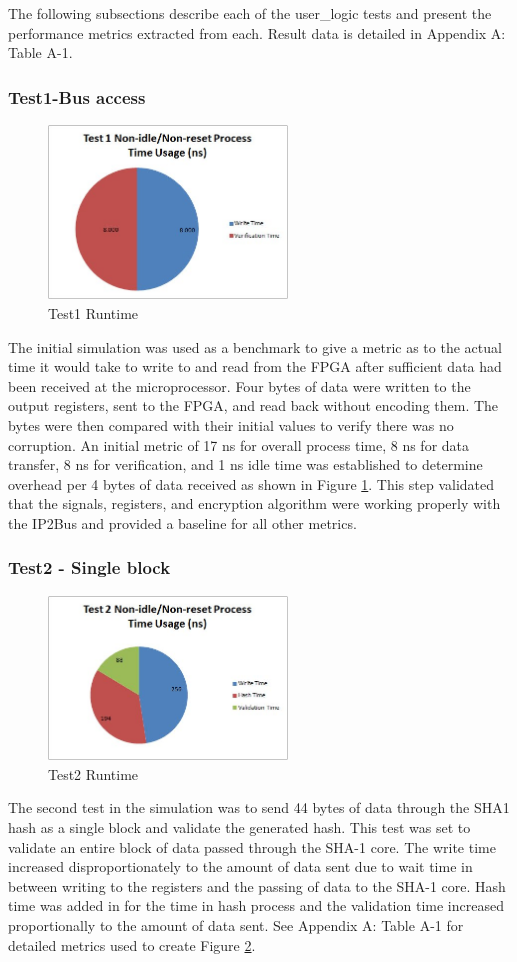 \documentclass[journal]{IEEEtran}
\begin{document}
The following subsections describe each of the user\_logic tests and present the performance metrics extracted from each.  Result data is detailed in Appendix A: Table A-1.
\subsubsection{Test1-Bus access}
\begin{figure}[ht]
\centering
\includegraphics[width=2.5in]{Test1.jpg}
\caption{Test1 Runtime}
\label{fig_test1Runtime}
\end{figure} 
The initial simulation was used as a benchmark to give a metric as to the actual time it would take to write to and read from the FPGA after sufficient data had been received at the microprocessor.  Four bytes of data were written to the output registers, sent to the FPGA, and read back without encoding them.  The bytes were then compared with their initial values to verify there was no corruption.  An initial metric of 17 ns for overall process time, 8 ns for data transfer, 8 ns for verification, and 1 ns idle time was established to determine overhead per 4 bytes of data received as shown in Figure \ref{fig_test1Runtime}.  This step validated that the signals, registers, and encryption algorithm were working properly with the IP2Bus and provided a baseline for all other metrics.
\subsubsection{Test2 - Single block}
\begin{figure}[ht]
\centering
\includegraphics[width=2.5in]{Test2.jpg}
\caption{Test2 Runtime}
\label{fig_test2Runtime}
\end{figure} 
The second test in the simulation was to send 44 bytes of data through the SHA1 hash as a single block and validate the generated hash.  This test was set to validate an entire block of data passed through the SHA-1 core.  The write time increased disproportionately to the amount of data sent due to wait time in between writing to the registers and the passing of data to the SHA-1 core.  Hash time was added in for the time in hash process and the validation time increased proportionally to the amount of data sent.  See Appendix A: Table A-1 for detailed metrics used to create Figure \ref{fig_test2Runtime}.
\end{document}
